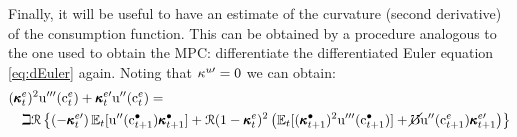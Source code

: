 \message{ !name(TractableBufferStock.tex)}\documentclass{handout}
\begin{document}
Finally, it will be useful to have an estimate of the curvature (second derivative) of the consumption function.  This can be obtained by a procedure analogous to the one used to obtain the MPC: differentiate the differentiated Euler equation \eqref{eq:dEuler} again.  Noting that $\kappa^{u\prime}=0$ we can obtain:
\begin{eqnarray}
\lefteqn{  (\MPCFunc^{e}_{t})^{2} \uPPP(\cFunc^{e}_{t}) +\MPCFunc_{t}^{e\prime}\uPP(\cFunc^{e}_{t}) = } &  & \nonumber \\ 
& & \beth \Rnorm \left\{(-\MPCFunc_{t}^{e\prime}) \Ex_{t}[\uPP(\cFunc^{\bullet}_{t+1})\MPCFunc^{\bullet}_{t+1}]
+  \Rnorm (1-\MPCFunc^{e}_{t})^{2}\left(\Ex_{t}[(\MPCFunc_{t+1}^{\bullet})^{2}\uPPP(\cFunc^{\bullet}_{t+1})]+\erate  \uPP(\cFunc^{e}_{t+1})\MPCFunc_{t+1}^{e\prime}\right)\right\} \nonumber \\ \label{eq:kappaPExpr}
\end{eqnarray}
\begin{comment} %
the limit of which as $\cRatE_{t} \rightarrow \infty$ is 
\begin{eqnarray}
\lefteqn{  (\MPCE)^{2} \uPPP(\cRatE_{t}) +\MPC^{e\prime}\uPP(\cRatE_{t}) = } &  & \nonumber \\ 
& & \beth \Rnorm (-\MPC^{e\prime}) \Ex_{t}[\uPP(\cFunc^{\bullet}_{t+1})\MPC^{\bullet}_{t+1}]
 + \beth \Rnorm^{2} (1-\MPCE)^{2} (\Ex_{t}[(\MPC_{t+1}^{\bullet})^{2}\uPPP(\cFunc^{\bullet}_{t+1})]+\erate \uPP(\cRatE_{t+1})\MPC^{e\prime}) \nonumber
\end{eqnarray}
but since as $\cRatE_{t} \rightarrow \infty$ the ratio of $\cRatE/\cTarg^{u}$ approaches 1 this approaches
\begin{eqnarray}
\lefteqn{  (\MPCE)^{2} \uPPP({c}_{t}) +\MPC^{e\prime}_{t}\uPP(c_{t}) = } &  & \nonumber \\ 
& & \beth \Rnorm (-\MPC^{e\prime}_{t}) \uPP(c_{t+1})\MPC
 + \beth \Rnorm^{2} (1-\MPCE)^{2} (\MPCE)^{2}\uPPP(c_{t+1})+\erate \uPP({c}_{t+1})\MPC^{e\prime}_{t+1}) \nonumber
\end{eqnarray}
but since $c_{t+1}$ approaches $\mu c_{t}$ this can be rewritten
\begin{eqnarray}
\lefteqn{  (\MPCE)^{2} \uPPP({c}_{t}) +\MPC^{e\prime}_{t}\uPP(c_{t}) = } &  & \nonumber \\ 
& & \beth \Rnorm (-\MPC^{e\prime}_{t}) \uPP(c_{t}) \mu^{-\CRRA-1}\MPC
 + \beth \Rnorm^{2} (1-\MPCE)^{2} (\MPCE)^{2}\uPPP(c_{t})\mu^{-\CRRA-2}+\erate \uPP({c}_{t})\mu^{-\CRRA-2}\MPC^{e\prime}_{t+1}) \nonumber
\end{eqnarray}
and dividing both sides by $\uPP(c_{t})$ and realizing that $\uPPP(c)/\uPP(c) = (\CRRA+1)/c$ we have
\begin{eqnarray}
\lefteqn{  (\MPCE)^{2} (\CRRA+1)/c_{t} +\MPC^{e\prime}_{t}= } &  & \nonumber \\ 
& & \beth \Rnorm (-\MPC^{e\prime}_{t})  \mu^{-\CRRA-1}\MPC
 + \beth \Rnorm^{2} (1-\MPCE)^{2} (\MPCE)^{2}\mu^{-\CRRA-2}(\CRRA+1)/c_{t}+\erate \mu^{-\CRRA-2}\MPC^{e\prime}_{t+1}) \nonumber
\end{eqnarray}
\end{comment}
\end{document}

